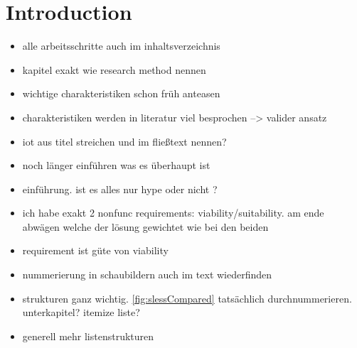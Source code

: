 \chapter{Introduction}

\begin{itemize}
        
    \item alle arbeitsschritte auch im inhaltsverzeichnis  
    
    \item kapitel exakt wie research method nennen 
    
    \item wichtige charakteristiken schon früh anteasen 
    
    \item charakteristiken werden in literatur viel besprochen --> valider ansatz
        
    \item iot aus titel streichen und im fließtext nennen?
    
    \item noch länger einführen was es überhaupt ist
    
    \item einführung. ist es alles nur hype oder nicht ?
    
    \item ich habe exakt 2 nonfunc requirements: viability/suitability. 
    am ende abwägen welche der lösung gewichtet wie bei den beiden 
    
    \item requirement ist güte von viability 
    
    \item nummerierung in schaubildern auch im text wiederfinden
    
    \item strukturen ganz wichtig. \ref{fig:slessCompared} tatsächlich durchnummerieren. unterkapitel? itemize liste?
    
    \item generell mehr listenstrukturen 
    
\end{itemize}



